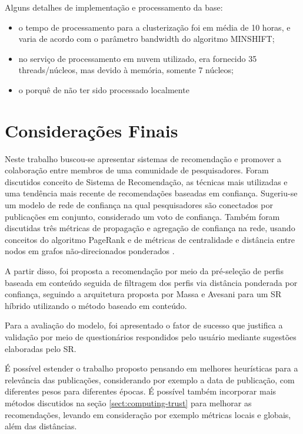 \documentclass[12pt]{article}
\begin{document}
Alguns detalhes de implementação e processamento da base:

\begin{itemize}
    \item o tempo de processamento para a clusterização foi em média de 10 horas, e varia de acordo com o parâmetro bandwidth do algoritmo MINSHIFT;
    \item no serviço de processamento em nuvem utilizado, era fornecido 35 threads/núcleos, mas devido à memória, somente 7 núcleos;
    \item o porquê de não ter sido processado localmente
\end{itemize}{}

\section{Considerações Finais}

Neste trabalho buscou-se apresentar sistemas de recomendação e promover a colaboração entre membros de uma comunidade de pesquisadores. Foram discutidos conceito de Sistema de Recomendação, as técnicas mais utilizadas e uma tendência mais recente de recomendações baseadas em confiança. Sugeriu-se um modelo de rede de confiança na qual pesquisadores são conectados por publicações em conjunto, considerado um voto de confiança. Também foram discutidas três métricas de propagação e agregação de confiança  na rede, usando conceitos do algoritmo PageRank \cite{page1999pagerank} e de métricas de centralidade e distância entre nodos em grafos  não-direcionados ponderados \cite{opsahl2010node}.

A partir disso, foi proposta a recomendação por meio da pré-seleção de perfis baseada em conteúdo seguida de filtragem dos perfis 
via distância ponderada por confiança, seguindo a arquitetura proposta por Massa e Avesani \cite{massa2004trust} para um SR híbrido 
utilizando o método baseado em conteúdo. 

Para a avaliação do modelo, foi apresentado o fator de sucesso que justifica a validação por meio de questionários respondidos pelo usuário mediante sugestões elaboradas pelo SR.

É possível estender o trabalho proposto pensando em melhores heurísticas para a relevância das publicações, considerando por 
exemplo a data de publicação, com diferentes pesos para diferentes épocas. É possível também incorporar mais métodos discutidos 
na seção \ref{sect:computing-trust} para melhorar as recomendações, levando em consideração por exemplo métricas locais e globais, 
além das distâncias.



\end{document}

